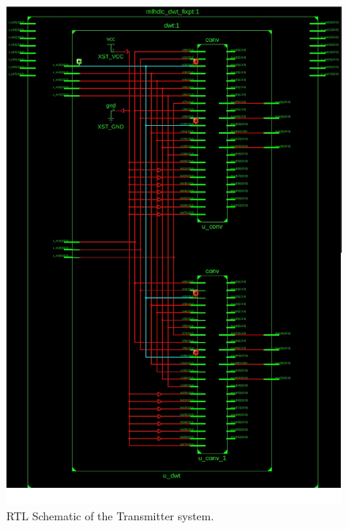 \begin{figure}
    \centering
    \includegraphics[width=156mm]{rtl_schematic.png}
    \caption{RTL Schematic of the Transmitter system.}
    \label{fig:rtl_transmitter}
\end{figure}

